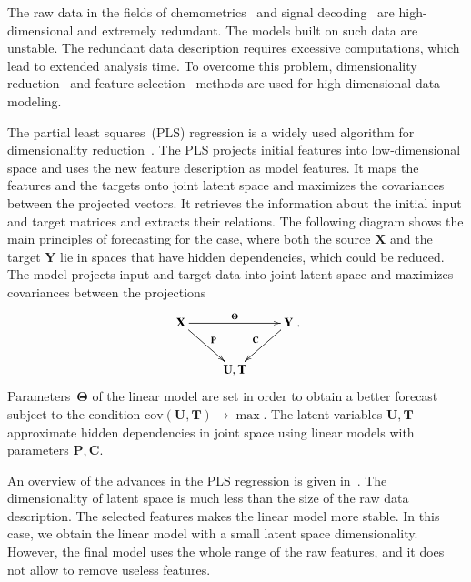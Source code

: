 \documentclass[preprint,authoryear,12pt]{elsarticle}
\theoremstyle{definition}
\begin{document}
The raw data in the fields of chemometrics~\citep{katrutsa2015stress,karimi2014leukemia,lin2016equivalence} and signal decoding~\citep{motrenko2018multi,eliseyev2014stable,eliseyev2012l1} are high-dimensional and extremely redundant.
The models built on such data are unstable. The redundant data description requires excessive computations, which lead to extended analysis time. 
To overcome this problem, dimensionality reduction~\citep{chun2010sparse,mehmood2012review} and feature selection~\citep{katrutsa2015stress,li2017feature} methods are used  for high-dimensional data modeling. 

The partial least squares~(PLS) regression is a widely used algorithm for dimensionality reduction~\citep{lauzon2018sequential,engel2017kernel,biancolillo2017extension,hervas2018sparse}. 
The PLS projects initial features into low-dimensional space and uses the new feature description as model features. 
It maps the features and the targets onto joint latent space and maximizes the covariances between the projected vectors. 
It retrieves the information about the initial input and target matrices and extracts their relations. 
%
The following diagram shows the main principles of forecasting for the case, where both the source $\mathbf{X}$ and the target $\mathbf{Y}$ lie in spaces that have hidden dependencies, which could be reduced. The model projects input and target data into joint latent space and maximizes covariances between the projections
\begin{equation*}
\xymatrix{\mathbf{X} \ar "1,3"^{\boldsymbol{\Theta}} \ar "2,2" ^{\mathbf{P}} & ~  & \mathbf{Y} \ar "2,2"_{\mathbf{C}}  \\ 
~ & \mathbf{U},\mathbf{T} & ~ }.
\end{equation*}
Parameters~$\boldsymbol{\Theta}$ of the linear model are set in order to obtain a better forecast subject to the condition $\text{cov}(\mathbf{U},\mathbf{T})\to\max$. The latent variables $\mathbf{U},\mathbf{T}$ approximate hidden dependencies in joint space using linear models with parameters $\mathbf{P},\mathbf{C}$.


An overview of the advances in the PLS regression is given in~\citep{rosipal2006overview,rosipal2011nonlinear}.
The dimensionality of latent space is much less than the size of the raw data description.
The selected features makes the linear model more stable. 
In this case, we obtain the linear model with a small latent space dimensionality.
However, the final model uses the whole range of the raw features, and it does not allow to remove useless features. 
\end{document}
